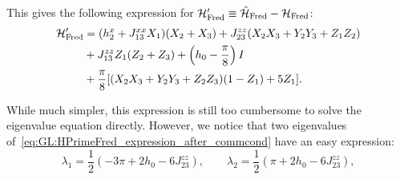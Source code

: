 This gives the following expression for ${\mathcal{H}}'_{\operatorname{Fred}}\equiv\tilde{{\mathcal{H}}}_{\operatorname{Fred}}-{\mathcal{H}}_{\operatorname{Fred}}$:
\begin{equation}
\begin{aligned}
    {\mathcal{H}}'_{\operatorname{Fred}} &=
    (h_2^x + J_{13}^{xx} X_1)(X_2+X_3)
    + J_{23}^{zz} (X_2 X_3 + Y_2 Y_3 + Z_1 Z_2) \\
    &+ J_{13}^{zz} Z_1 (Z_2 + Z_3)
    + \left(h_0 - \frac{\pi}{8}\right) I \\
    &+ \frac{\pi}{8} [
        (X_2 X_3 + Y_2 Y_3 + Z_2 Z_3) (1 - Z_1)
        + 5 Z_1
    ].
\end{aligned}
\label{eq:GL:HPrimeFred_expression_after_commcond}
\end{equation}

While much simpler, this expression is still too cumbersome to solve the eigenvalue equation directly.
However, we notice that two eigenvalues of~\cref{eq:GL:HPrimeFred_expression_after_commcond} have an easy expression:
\begin{equation}
    \lambda_1 = \frac{1}{2}( -3\pi + 2h_0 - 6J_{23}^{zz}),
    \qquad
    \lambda_2 = \frac{1}{2}( \pi   + 2h_0 - 6J_{23}^{zz}),
\label{eq:GL:fredkin_first_two_nice_eigenvalues}
\end{equation}

